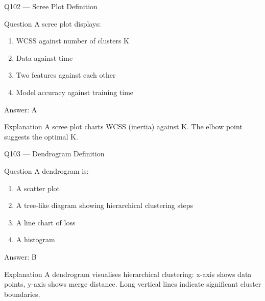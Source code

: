 \documentclass[aspectratio=169,8pt]{beamer}
\begin{document}
	\begin{frame}{Q102 --- Scree Plot Definition}
		\begin{block}{Question}
			A scree plot displays:
			\begin{enumerate}
				\item WCSS against number of clusters K
				\item Data against time
				\item Two features against each other
				\item Model accuracy against training time
			\end{enumerate}
		\end{block}
		\begin{exampleblock}{Answer: A}\end{exampleblock}
		\begin{block}{Explanation}
			A scree plot charts WCSS (inertia) against K. The elbow point suggests the optimal K.
		\end{block}
	\end{frame}
	
	\begin{frame}{Q103 --- Dendrogram Definition}
		\begin{block}{Question}
			A dendrogram is:
			\begin{enumerate}
				\item A scatter plot
				\item A tree-like diagram showing hierarchical clustering steps
				\item A line chart of loss
				\item A histogram
			\end{enumerate}
		\end{block}
		\begin{exampleblock}{Answer: B}\end{exampleblock}
		\begin{block}{Explanation}
			A dendrogram visualises hierarchical clustering: x-axis shows data points, y-axis shows merge distance. Long vertical lines indicate significant cluster boundaries.
		\end{block}
	\end{frame}
	
\end{document}
